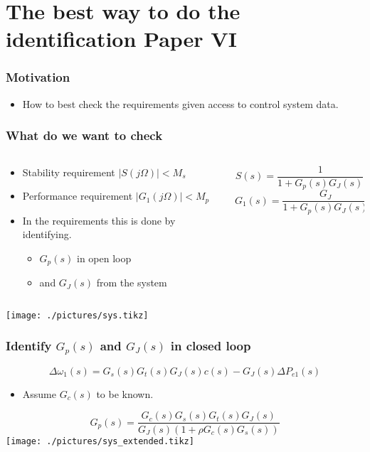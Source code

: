 \section{The best way to do the identification Paper VI}
\begin{frame}
	\frametitle{Motivation}
	\begin{itemize}
		\item How to best check the requirements given access to control system data.
	\end{itemize}
\end{frame}
\begin{frame}
	\frametitle{What do we want to check}
	\begin{columns}
		\begin{column}{0.6\textwidth}
			\begin{itemize}
				\item Stability requirement $|S(j\Omega)| < M_s$
				\item Performance requirement $|G_1(j\Omega)| < M_p$
				\item In the requirements this is done by identifying.
			\begin{itemize}
				\item $G_p(s)$ in open loop 
				\item and $G_J(s)$ from the system
			\end{itemize}
		\end{itemize}
		\end{column}
		\begin{column}{0.4\textwidth}
			\begin{equation*}
				S(s) = \frac{1}{1+G_p(s)G_J(s)}
			\end{equation*}
			\begin{equation*}
				G_1(s) = \frac{G_{J}}{1+G_p(s)G_J(s)}
			\end{equation*}
		\end{column}
	\end{columns}
	\texttt{[image: ./pictures/sys.tikz]}
\end{frame}
\begin{frame}
		\frametitle{Identify $G_p(s)$ and $G_J(s)$ in closed loop}
	\begin{equation}
		\Delta \omega_1(s) = G_s(s)G_t(s)G_J(s)c(s)- G_J(s)\Delta P_{e1}(s)
	\end{equation}
	\begin{itemize}
		\item Assume $G_c(s)$ to be known.
	\end{itemize}
	\begin{equation}
		G_p(s) = \frac{G_c(s)G_s(s)G_t(s)G_J(s)}{G_J(s)(1+\rho G_c(s)G_s(s))}
	\end{equation}
	\texttt{[image: ./pictures/sys\_extended.tikz]}
\end{frame}
